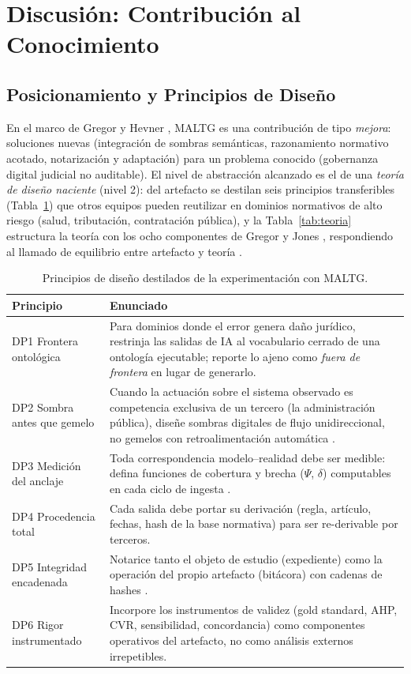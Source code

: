 \documentclass[computers,article,submit,pdftex,moreauthors]{Definitions/mdpi}
\begin{document}
\section{Discusión: Contribución al Conocimiento}
\label{sec:discusion}

\subsection{Posicionamiento y Principios de Diseño}
En el marco de Gregor y Hevner \cite{Gregor2013}, MALTG es una contribución de tipo \emph{mejora}: soluciones nuevas (integración de sombras semánticas, razonamiento normativo acotado, notarización y adaptación) para un problema conocido (gobernanza digital judicial no auditable). El nivel de abstracción alcanzado es el de una \emph{teoría de diseño naciente} (nivel 2): del artefacto se destilan seis principios transferibles (Tabla~\ref{tab:dp}) que otros equipos pueden reutilizar en dominios normativos de alto riesgo (salud, tributación, contratación pública), y la Tabla~\ref{tab:teoria} estructura la teoría con los ocho componentes de Gregor y Jones \cite{GregorJones2007}, respondiendo al llamado de equilibrio entre artefacto y teoría \cite{Baskerville2018}.

\begin{table}[H]
\caption{Principios de diseño destilados de la experimentación con MALTG.}
\label{tab:dp}
\begin{tabularx}{\textwidth}{lX}
\toprule
\textbf{Principio} & \textbf{Enunciado}\\
\midrule
DP1 Frontera ontológica & Para dominios donde el error genera daño jurídico, restrinja las salidas de IA al vocabulario cerrado de una ontología ejecutable; reporte lo ajeno como \emph{fuera de frontera} en lugar de generarlo.\\
DP2 Sombra antes que gemelo & Cuando la actuación sobre el sistema observado es competencia exclusiva de un tercero (la administración pública), diseñe sombras digitales de flujo unidireccional, no gemelos con retroalimentación automática \cite{Kritzinger2018}.\\
DP3 Medición del anclaje & Toda correspondencia modelo--realidad debe ser medible: defina funciones de cobertura y brecha ($\Psi$, $\delta$) computables en cada ciclo de ingesta \cite{Karabulut2024}.\\
DP4 Procedencia total & Cada salida debe portar su derivación (regla, artículo, fechas, hash de la base normativa) para ser re-derivable por terceros.\\
DP5 Integridad encadenada & Notarice tanto el objeto de estudio (expediente) como la operación del propio artefacto (bitácora) con cadenas de hashes \cite{Haber1991}.\\
DP6 Rigor instrumentado & Incorpore los instrumentos de validez (gold standard, AHP, CVR, sensibilidad, concordancia) como componentes operativos del artefacto, no como análisis externos irrepetibles.\\
\bottomrule
\end{tabularx}
\end{table}
\end{document}
